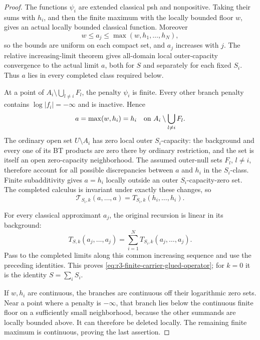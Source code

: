 \documentclass[11pt,a4paper]{article}
\numberwithin{equation}{section}
\theoremstyle{definition}
\theoremstyle{remark}
\begin{document}
\begin{proof}
The functions $\psi_i$ are extended classical psh and
nonpositive. Taking their sums with $h_i$, and then the finite
maximum with the locally bounded floor $w$, gives an actual
locally bounded classical function. Moreover
\[
 w\leq a_j\leq\max(w,h_1,\ldots,h_N),
\]
so the bounds are uniform on each compact set, and $a_j$
increases with $j$. The relative increasing-limit theorem gives
all-domain local outer-capacity convergence to the actual limit
$a$, both for $S$ and separately for each fixed $S_i$.
Thus $a$ lies in every completed class required below.

At a point of $A_i\setminus\bigcup_{l\ne i}F_l$, the
penalty $\psi_i$ is finite. Every other branch penalty contains
$\log|f_i|=-\infty$ and is inactive. Hence
\[
 a=\max(w,h_i)=h_i
        \quad\hbox{on }A_i\setminus\bigcup_{l\ne i}F_l.
\]
The ordinary open set $U\setminus A_i$ has zero local outer
$S_i$-capacity: the background and every one of its BT products
are zero there by ordinary restriction, and the set is itself
an open zero-capacity neighborhood. The assumed outer-null
sets $F_l$, $l\ne i$, therefore account for all possible
discrepancies between $a$ and $h_i$ in the $S_i$-class.
Finite subadditivity gives
$a=h_i$ locally outside an outer $S_i$-capacity-zero set.
The completed calculus is invariant under exactly these changes,
so
\[
 \mathcal T_{S_i,k}(a,\ldots,a)
                 =T_{S_i,k}(h_i,\ldots,h_i).
\]

For every classical approximant $a_j$, the original recursion
is linear in its background:
\[
 T_{S,k}(a_j,\ldots,a_j)
          =\sum_{i=1}^N T_{S_i,k}(a_j,\ldots,a_j).
\]
Pass to the completed limits along this common increasing
sequence and use the preceding identities. This proves
\eqref{eq:r3-finite-carrier-glued-operator}; for $k=0$ it is
the identity $S=\sum_iS_i$.

If $w,h_i$ are continuous, the branches are continuous off
their logarithmic zero sets. Near a point where a penalty is
$-\infty$, that branch lies below the continuous finite floor
on a sufficiently small neighborhood, because the other
summands are locally bounded above. It can therefore be deleted
locally. The remaining finite maximum is continuous, proving
the last assertion.
\end{proof}
\end{document}
